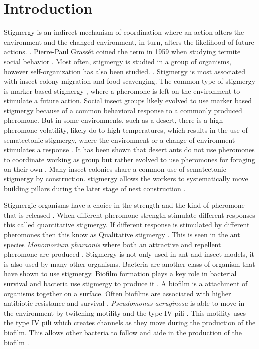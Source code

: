 \section{Introduction}

Stigmergy is an indirect mechanism of coordination where an action alters the environment and the changed environment, in turn, alters the likelihood of future actions. \cite{susi_social_2001, ahadeli_multi-agent_2004}.
Pierre-Paul Grassét coined the term in 1959 when studying termite social behavior \cite{heylighen_stigmergy_2016a}.
Most often, stigmergy is studied in a group of organisms, however self-organization has also been studied.  \cite{heylighen_stigmergy_2016b}.
Stigmergy is most associated with  insect colony migration and food scavenging.
The common type of stigmergy is marker-based stigmergy \cite{ahadeli_multi-agent_2004, heylighen_stigmergy_2016b}, where a pheromone is left on the environment to stimulate a future  action.
Social insect groups likely evolved to use marker based stigmergy because of a common behavioral response to a commonly produced pheromone.
But in some environments, such as a desert, there is a high pheromone volatility, likely do to high temperatures, which results in the use of sematectonic stigmergy, where the environment or a change of environment stimulates a response \cite{ahadeli_multi-agent_2004, heylighen_stigmergy_2016a}. It has been shown that desert ants do not use pheromones to coordinate working as group but rather evolved to use pheromones for foraging on their own \cite{ruano_high_2000}.
Many insect colonies share a common use of sematectonic stigmergy by construction. stigmergy allows the workers to systematically move building pillars during the later stage of nest construction \cite{dorigo_ant_2000,khuong_stigmergic_2016}.

Stigmergic organisms have a choice in the strength and the kind of pheromone that is released \cite{theraulaz1999brief}.
When different pheromone  strength stimulate different responses  this called quantitative stigmergy. If different  response is stimulated by different pheromones then this know as  Qualitative stigmergy \cite{heylighen_stigmergy_2016b}.
This is seen in the ant species \textit{Monomorium pharaonis} where both an attractive and repellent pheromone are produced  \cite{jeanson_pced heromone_2003}.
Stigmergy is not only used in ant and insect models, it is also used by many other organisms.
Bacteria are another class of organism that have shown to use stigmergy.
Biofilm formation plays a key role in bacterial survival and bacteria use stigmergy to produce it \cite{gloag_bacterial_2015}.
A biofilm is a attachment of organisms together on a surface.
Often biofilms are associated with higher antibiotic resistance and survival \cite{donlan2002biofilms}.
\textit{Pseudomonas aeruginosa} is able to move in the environment by twitching motility and the type IV pili \cite{persat2015type}.
This motility uses the type IV pili which creates channels as they move during the production of the biofilm.
This allows other bacteria to follow and aide in the production of the biofilm \cite{gloag_stigmergy:_2013}.

